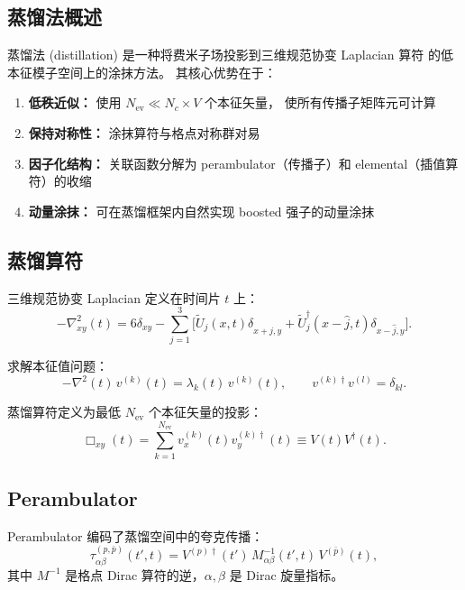 \documentclass[12pt,a4paper]{ctexart}
\begin{document}
\subsection{蒸馏法概述}

蒸馏法 (distillation) 是一种将费米子场投影到三维规范协变 Laplacian 算符
的低本征模子空间上的涂抹方法\cite{distillation, 蒸馏方法}。
其核心优势在于：

\begin{enumerate}
    \item \textbf{低秩近似：} 使用 $N_{\text{ev}} \ll N_c \times V$ 个本征矢量，
        使所有传播子矩阵元可计算
    \item \textbf{保持对称性：} 涂抹算符与格点对称群对易
    \item \textbf{因子化结构：} 关联函数分解为 perambulator（传播子）和
        elemental（插值算符）的收缩
    \item \textbf{动量涂抹：} 可在蒸馏框架内自然实现 boosted 强子的动量涂抹
\end{enumerate}

\subsection{蒸馏算符}

三维规范协变 Laplacian 定义在时间片 $t$ 上\cite{蒸馏方法}：
\begin{equation}\label{eq:laplacian}
-\nabla^{2}_{xy}(t) = 6\delta_{xy}
    - \sum_{j=1}^{3} \big[ \tilde{U}_j(x,t) \delta_{x+\hat{j},y}
    + \tilde{U}^{\dagger}_j(x-\hat{j},t) \delta_{x-\hat{j},y} \big].
\end{equation}

求解本征值问题：
\begin{equation}
-\nabla^{2}(t) \, v^{(k)}(t) = \lambda_k(t) \, v^{(k)}(t),
\qquad v^{(k)\dagger} v^{(l)} = \delta_{kl}.
\end{equation}

蒸馏算符定义为最低 $N_{\text{ev}}$ 个本征矢量的投影\cite{蒸馏方法}：
\begin{equation}\label{eq:distillation_op}
\boxed{
\Box_{xy}(t) = \sum_{k=1}^{N_{\text{ev}}} v^{(k)}_x(t) v^{(k)\dagger}_y(t)
    \equiv V(t) V^{\dagger}(t).
}
\end{equation}

\subsection{Perambulator}

Perambulator 编码了蒸馏空间中的夸克传播\cite{蒸馏方法}：
\begin{equation}\label{eq:perambulator}
\boxed{
\tau^{(p,\bar{p})}_{\alpha\beta}(t', t) =
    V^{(p)\dagger}(t') \, M^{-1}_{\alpha\beta}(t', t) \, V^{(\bar{p})}(t),
}
\end{equation}
其中 $M^{-1}$ 是格点 Dirac 算符的逆，$\alpha,\beta$ 是 Dirac 旋量指标。
\end{document}
